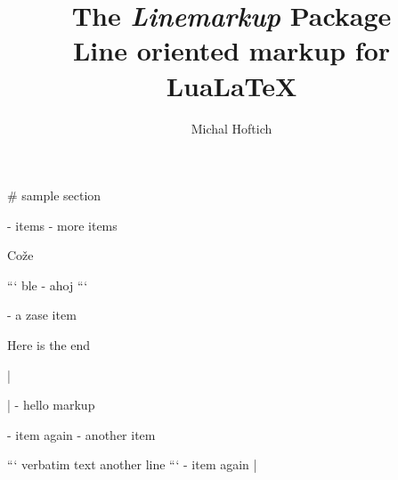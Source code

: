 \documentclass{article}
\begin{document}
\title{The \textit{Linemarkup} Package\\Line oriented markup for LuaLaTeX}
\author{Michal Hoftich}

\maketitle





\begin{exampleenv}
# sample section

- items 
- more items



Cože

```
ble
- ahoj
```


- a zase item
\end{exampleenv}





% 






Here is the end

\LinemarkupAddBlock|%

\pokus|
- hello markup

- item again
- another item

```
verbatim text
  another line
```
- item again
|
\end{document}
